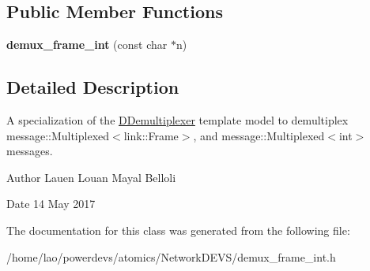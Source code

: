 \subsection*{Public Member Functions}
\begin{DoxyCompactItemize}
\item 
{\bfseries demux\+\_\+frame\+\_\+int} (const char $\ast$n)\hypertarget{classdemux__frame__int_a5a09189d2e054528070a5c3e94476854}{}\label{classdemux__frame__int_a5a09189d2e054528070a5c3e94476854}

\end{DoxyCompactItemize}


\subsection{Detailed Description}
A specialization of the \hyperlink{classDDemultiplexer}{D\+Demultiplexer} template model to demultiplex message\+::\+Multiplexed$<$link\+::\+Frame$>$, and message\+::\+Multiplexed$<$int$>$ messages. 

\begin{DoxyAuthor}{Author}
Lauen Louan Mayal Belloli 
\end{DoxyAuthor}
\begin{DoxyDate}{Date}
14 May 2017 
\end{DoxyDate}


The documentation for this class was generated from the following file\+:\begin{DoxyCompactItemize}
\item 
/home/lao/powerdevs/atomics/\+Network\+D\+E\+V\+S/demux\+\_\+frame\+\_\+int.\+h\end{DoxyCompactItemize}

